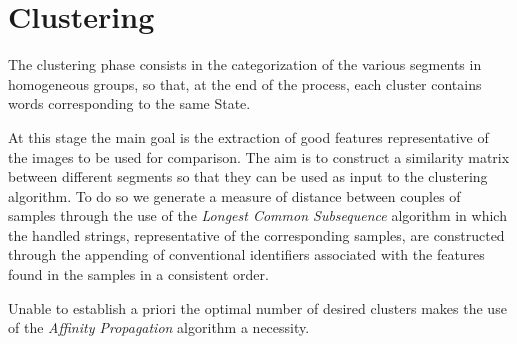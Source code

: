 \section{Clustering}
\label{Nostro_prog}
The clustering phase consists in the categorization of the various segments in homogeneous groups, so that, at the end of the process, each cluster contains  words corresponding to the same State.

At this stage the main goal is the extraction of good features representative of the images to be used for comparison. The aim is to construct a similarity matrix between different segments so that they can be used as input to the clustering algorithm. To do so we generate a measure of distance between couples of samples through the use of the \emph{Longest Common Subsequence} algorithm in which the handled strings, representative of the corresponding samples, are constructed through the appending of conventional identifiers associated with the features found in the samples in a consistent order. 

Unable to establish a priori the optimal number of desired clusters makes the use of the \emph{Affinity Propagation} algorithm a necessity.
